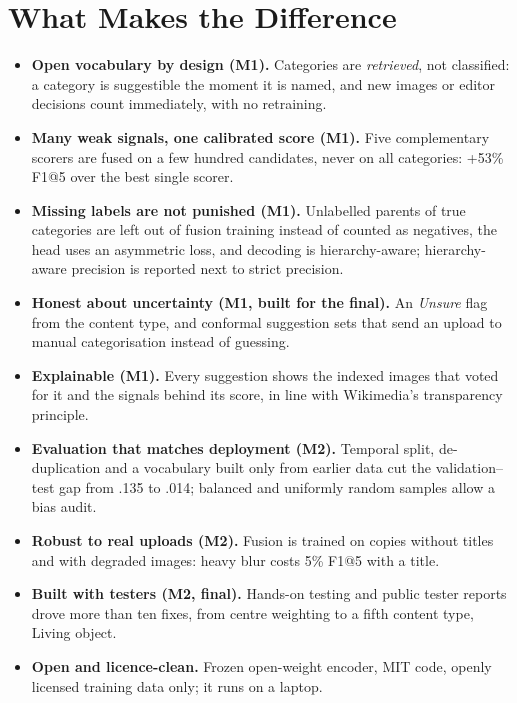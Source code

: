 \documentclass[10pt,twocolumn]{article}
\begin{document}
\section{What Makes the Difference}
\begin{itemize}
\item \textbf{Open vocabulary by design (M1).} Categories are \emph{retrieved}, not classified: a category
is suggestible the moment it is named, and new images or editor decisions count immediately, with no
retraining.
\item \textbf{Many weak signals, one calibrated score (M1).} Five complementary scorers are fused on a few
hundred candidates, never on all categories: +53\% F1@5 over the best single scorer.
\item \textbf{Missing labels are not punished (M1).} Unlabelled parents of true categories are left out of
fusion training instead of counted as negatives, the head uses an asymmetric loss, and decoding is
hierarchy-aware; hierarchy-aware precision is reported next to strict precision.
\item \textbf{Honest about uncertainty (M1, built for the final).} An \emph{Unsure} flag from the content
type, and conformal suggestion sets that send an upload to manual categorisation instead of guessing.
\item \textbf{Explainable (M1).} Every suggestion shows the indexed images that voted for it and the
signals behind its score, in line with Wikimedia's transparency principle.
\item \textbf{Evaluation that matches deployment (M2).} Temporal split, de-duplication and a vocabulary
built only from earlier data cut the validation--test gap from .135 to .014; balanced and uniformly random
samples allow a bias audit.
\item \textbf{Robust to real uploads (M2).} Fusion is trained on copies without titles and with degraded
images: heavy blur costs 5\% F1@5 with a title.
\item \textbf{Built with testers (M2, final).} Hands-on testing and public tester reports drove more
than ten fixes, from centre weighting to a fifth content type, Living object.
\item \textbf{Open and licence-clean.} Frozen open-weight encoder, MIT code, openly licensed training data
only; it runs on a laptop.
\end{itemize}
\end{document}
